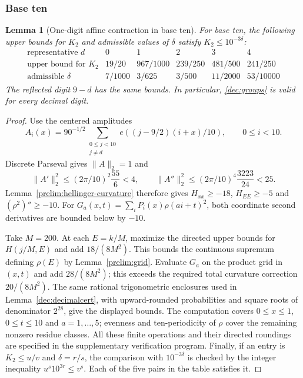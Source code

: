 \documentclass[11pt,a4paper]{article}
\theoremstyle{paperplain}
\newtheorem{lemma}[theorem]{Lemma}
\numberwithin{equation}{section}
\begin{document}
\subsubsection{Base ten}

\begin{lemma}[One-digit affine contraction in base ten]
\label{dec:decimalhellinger}
For base ten, the following upper bounds for $K_2$ and admissible values
of $\delta$ satisfy $K_2\le10^{-3\delta}$:
\[
\begin{array}{c|ccccc}
 \text{representative }d&0&1&2&3&4\\ \hline
 \text{upper bound for }K_2&19/20&967/1000&239/250&481/500&241/250\\
 \text{admissible }\delta&7/1000&3/625&3/500&11/2000&53/10000
\end{array}
\]
The reflected digit $9-d$ has the same bounds. In particular,
\eqref{dec:groups} is valid for every decimal digit.
\end{lemma}
\begin{proof}
Use the centered amplitudes
\[
 A_i(x)=90^{-1/2}\sum_{\substack{0\le j<10\\j\ne d}}
             e((j-9/2)(i+x)/10),\qquad 0\le i<10.
\]
Discrete Parseval gives $\|A\|_2=1$ and
\[
 \|A'\|_2^2\le(2\pi/10)^2\frac{55}{6}<4,\qquad
 \|A''\|_2^2\le(2\pi/10)^4\frac{3223}{24}<25.
\]
Lemma~\ref{prelim:hellinger-curvature} therefore gives
$H_{xx}\ge-18$, $H_{EE}\ge-5$ and $(\rho^2)''\ge-10$.
For $G_a(x,t)=\sum_iP_i(x)\rho(ai+t)^2$, both coordinate second
derivatives are bounded below by $-10$.

Take $M=200$. At each $E=k/M$, maximize the directed upper bounds
for $H(j/M,E)$ and add $18/(8M^2)$. This bounds the continuous
supremum defining $\rho(E)$ by Lemma~\ref{prelim:grid}.
Evaluate $G_a$ on the product grid in $(x,t)$ and add $28/(8M^2)$;
this exceeds the required total curvature correction $20/(8M^2)$.
The same rational trigonometric enclosures used in
Lemma~\ref{dec:decimalcert}, with upward-rounded probabilities and
square roots of denominator $2^{28}$, give the displayed bounds.
The computation covers $0\le x\le1$, $0\le t\le10$ and
$a=1,\ldots,5$; evenness and ten-periodicity of $\rho$ cover the
remaining nonzero residue classes.
All these finite operations and their directed roundings are specified
in the supplementary verification program.
Finally, if an entry is $K_2\le u/v$ and $\delta=r/s$, the comparison
with $10^{-3\delta}$ is checked by the integer inequality
$u^s10^{3r}\le v^s$. Each of the five pairs in the table satisfies it.
\end{proof}
\end{document}
